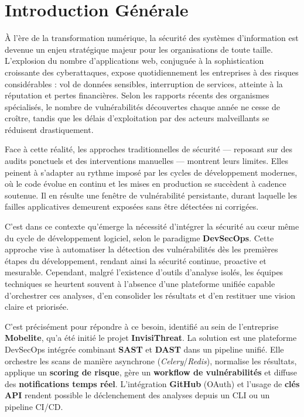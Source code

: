\chapter*{Introduction Générale}

\noindent À l'ère de la transformation numérique, la sécurité des systèmes d'information est devenue un enjeu stratégique majeur pour les organisations de toute taille. L'explosion du nombre d'applications web, conjuguée à la sophistication croissante des cyberattaques, expose quotidiennement les entreprises à des risques considérables : vol de données sensibles, interruption de services, atteinte à la réputation et pertes financières. Selon les rapports récents des organismes spécialisés, le nombre de vulnérabilités découvertes chaque année ne cesse de croître, tandis que les délais d'exploitation par des acteurs malveillants se réduisent drastiquement.

\medskip
\noindent Face à cette réalité, les approches traditionnelles de sécurité — reposant sur des audits ponctuels et des interventions manuelles — montrent leurs limites. Elles peinent à s'adapter au rythme imposé par les cycles de développement modernes, où le code évolue en continu et les mises en production se succèdent à cadence soutenue. Il en résulte une fenêtre de vulnérabilité persistante, durant laquelle les failles applicatives demeurent exposées sans être détectées ni corrigées.

\medskip
\noindent C'est dans ce contexte qu'émerge la nécessité d'intégrer la sécurité au cœur même du cycle de développement logiciel, selon le paradigme \textbf{DevSecOps}. Cette approche vise à automatiser la détection des vulnérabilités dès les premières étapes du développement, rendant ainsi la sécurité continue, proactive et mesurable. Cependant, malgré l'existence d'outils d'analyse isolés, les équipes techniques se heurtent souvent à l'absence d'une plateforme unifiée capable d'orchestrer ces analyses, d'en consolider les résultats et d'en restituer une vision claire et priorisée.

\medskip
\noindent C'est précisément pour répondre à ce besoin, identifié au sein de l'entreprise \textbf{Mobelite}, qu'a été initié le projet \textbf{InvisiThreat}. La solution est une plateforme DevSecOps intégrée combinant \textbf{SAST} et \textbf{DAST} dans un pipeline unifié. Elle orchestre les scans de manière asynchrone (\textit{Celery}/\textit{Redis}), normalise les résultats, applique un \textbf{scoring de risque}, gère un \textbf{workflow de vulnérabilités} et diffuse des \textbf{notifications temps réel}. L'intégration \textbf{GitHub} (OAuth) et l'usage de \textbf{clés API} rendent possible le déclenchement des analyses depuis un CLI ou un pipeline CI/CD.

